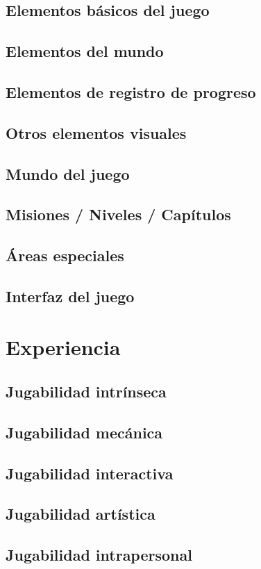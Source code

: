 \subsection{Elementos básicos del juego}
\subsection{Elementos del mundo}
\subsection{Elementos de registro de progreso}
\subsection{Otros elementos visuales}
\subsection{Mundo del juego}
\subsection{Misiones / Niveles / Capítulos}
\subsection{Áreas especiales}
\subsection{Interfaz del juego}


\section{Experiencia}
\subsection{Jugabilidad intrínseca}
\subsection{Jugabilidad mecánica}
\subsection{Jugabilidad interactiva}
\subsection{Jugabilidad artística}
\subsection{Jugabilidad intrapersonal}
